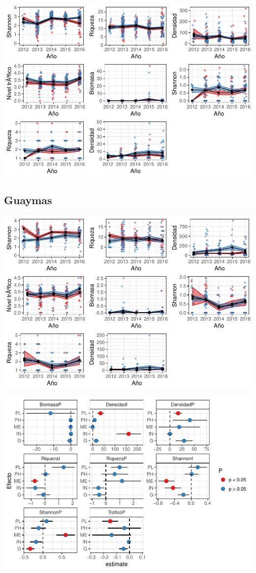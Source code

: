 \documentclass[12pt,]{article}
\begin{document}
\includegraphics{Manuscript_files/figure-latex/unnamed-chunk-10-1.pdf}

\subsection{Guaymas}\label{guaymas-1}

\includegraphics{Manuscript_files/figure-latex/unnamed-chunk-11-1.pdf}

\includegraphics{Manuscript_files/figure-latex/unnamed-chunk-12-1.pdf}
\end{document}
